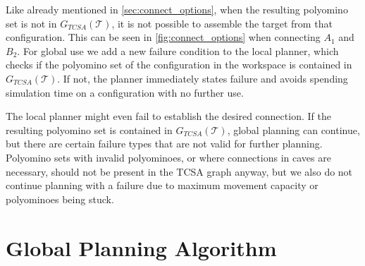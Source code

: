Like already mentioned in \autoref{sec:connect_options}, when the resulting polyomino set is not in $G_{\textit{TCSA}}(\mathcal{T})$, it is not possible to assemble the target from that configuration.
This can be seen in \autoref{fig:connect_options} when connecting $A_1$ and $B_2$.
For global use we add a new failure condition to the local planner, which checks if the polyomino set of the configuration in the workspace is contained in $G_{\textit{TCSA}}(\mathcal{T})$.
If not, the planner immediately states failure and avoids spending simulation time on a configuration with no further use.

The local planner might even fail to establish the desired connection.
If the resulting polyomino set is contained in $G_{\textit{TCSA}}(\mathcal{T})$, global planning can continue, but there are certain failure types that are not valid for further planning.
Polyomino sets with invalid polyominoes, or where connections in caves are necessary, should not be present in the TCSA graph anyway, but we also do not continue planning with a failure due to maximum movement capacity or polyominoes being stuck.

\section{Global Planning Algorithm}
\label{sec:global_algo}

